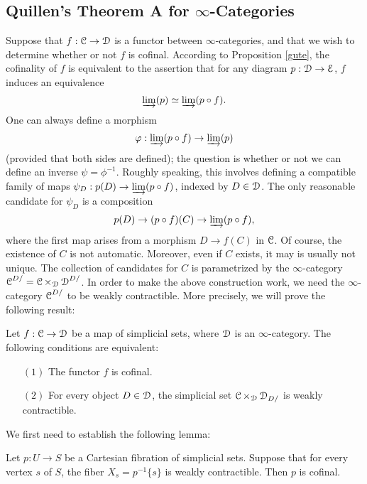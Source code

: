 \subsection{Quillen's Theorem A for $\infty$-Categories}\label{quillA}

Suppose that $f: \calC \rightarrow \calD$ is a functor between $\infty$-categories, and that we wish to determine whether or not $f$ is cofinal. According to Proposition \ref{gute}, the cofinality of $f$ is equivalent to the assertion that for any diagram $p: \calD \rightarrow \calE$, $f$ induces an equivalence
$$ \injlim(p) \simeq \injlim(p \circ f).$$
One can always define a morphism
$$ \phi: \injlim(p \circ f) \rightarrow \injlim(p)$$
(provided that both sides are defined); the question is whether or not we can define an inverse $\psi = \phi^{-1}$. Roughly speaking, this involves defining a compatible family of maps
$\psi_{D}: p(D) \rightarrow \injlim(p \circ f)$, indexed by $D \in \calD$. The only reasonable
candidate for $\psi_{D}$ is a composition
$$ p(D) \rightarrow (p \circ f)(C) \rightarrow \injlim(p \circ f),$$
where the first map arises from a morphism $D \rightarrow f(C)$ in $\calC$. Of course, the existence of $C$ is not automatic. Moreover, even if $C$ exists, it may is usually not unique. The collection of candidates for $C$ is parametrized by the $\infty$-category $\calC^{D/} = \calC \times_{\calD} \calD^{D/}$. In order to make the above construction work, we need the $\infty$-category
$\calC^{D/}$ to be weakly contractible. More precisely, we will prove the following result:

\begin{theorem}\label{hollowtt}
Let $f: \calC \rightarrow \calD$ be a map of simplicial sets, where $\calD$ is an $\infty$-category. The following
conditions are equivalent:
\begin{itemize}
\item[$(1)$] The functor $f$ is cofinal.
\item[$(2)$] For every object $D \in \calD$, the simplicial set
$\calC \times_{ \calD } \calD_{D/}$ is weakly contractible.
\end{itemize}
\end{theorem}

We first need to establish the following lemma:

\begin{lemma}\label{trull6prime}
Let $p: U \rightarrow S$ be a Cartesian fibration of simplicial sets. Suppose
that for every vertex $s$ of $S$, the fiber $X_{s} = p^{-1} \{s\}$ is weakly contractible. Then $p$ is cofinal.
\end{lemma}

